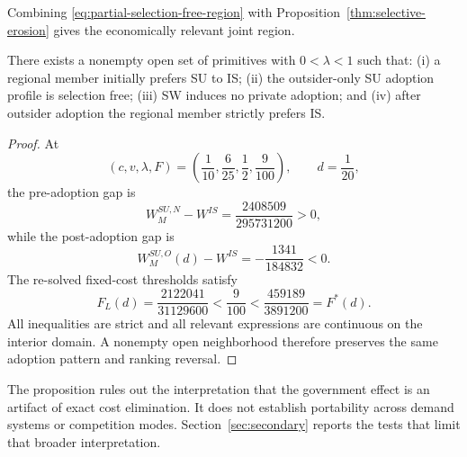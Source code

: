 Combining \eqref{eq:partial-selection-free-region} with Proposition~\ref{thm:selective-erosion} gives the economically relevant joint region.

\begin{proposition}
\label{prop:incomplete-adaptation-open-set}
There exists a nonempty open set of primitives with $0<\lambda<1$ such that: (i) a regional member initially prefers SU to IS; (ii) the outsider-only SU adoption profile is selection free; (iii) SW induces no private adoption; and (iv) after outsider adoption the regional member strictly prefers IS.
\end{proposition}

\begin{proof}
At
\[
(c,v,\lambda,F)
=
\left(
\frac1{10},
\frac6{25},
\frac12,
\frac9{100}
\right),
\qquad
d=\frac1{20},
\]
the pre-adoption gap is
\[
W_M^{SU,N}-W^{IS}
=
\frac{2408509}{295731200}>0,
\]
while the post-adoption gap is
\[
W_M^{SU,O}(d)-W^{IS}
=
-\frac{1341}{184832}<0.
\]
The re-solved fixed-cost thresholds satisfy
\[
F_L(d)
=
\frac{2122041}{31129600}
<
\frac9{100}
<
\frac{459189}{3891200}
=
F^*(d).
\]
All inequalities are strict and all relevant expressions are continuous on the interior domain. A nonempty open neighborhood therefore preserves the same adoption pattern and ranking reversal.
\end{proof}

The proposition rules out the interpretation that the government effect is an artifact of exact cost elimination. It does not establish portability across demand systems or competition modes. Section~\ref{sec:secondary} reports the tests that limit that broader interpretation.
